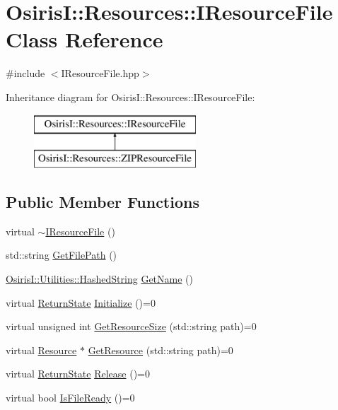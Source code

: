 \hypertarget{class_osiris_i_1_1_resources_1_1_i_resource_file}{\section{Osiris\-I\-:\-:Resources\-:\-:I\-Resource\-File Class Reference}
\label{class_osiris_i_1_1_resources_1_1_i_resource_file}
}


{\ttfamily \#include $<$I\-Resource\-File.\-hpp$>$}

Inheritance diagram for Osiris\-I\-:\-:Resources\-:\-:I\-Resource\-File\-:\begin{figure}[H]
\begin{center}
\leavevmode
\includegraphics[height=2.000000cm]{class_osiris_i_1_1_resources_1_1_i_resource_file}
\end{center}
\end{figure}
\subsection*{Public Member Functions}
\begin{DoxyCompactItemize}
\item 
virtual \hyperlink{class_osiris_i_1_1_resources_1_1_i_resource_file_aa9fbf9010e9ebbfa7ddc7952415b5c42}{$\sim$\-I\-Resource\-File} ()
\item 
std\-::string \hyperlink{class_osiris_i_1_1_resources_1_1_i_resource_file_a1b78a2e1ebf8ae9cc51e4ef23938cb3d}{Get\-File\-Path} ()
\item 
\hyperlink{class_osiris_i_1_1_utilities_1_1_hashed_string}{Osiris\-I\-::\-Utilities\-::\-Hashed\-String} \hyperlink{class_osiris_i_1_1_resources_1_1_i_resource_file_a20d04636b11bda62c6078d636b0bdf01}{Get\-Name} ()
\item 
virtual \hyperlink{namespace_osiris_i_a8f53bf938dc75c65c6a529694514013e}{Return\-State} \hyperlink{class_osiris_i_1_1_resources_1_1_i_resource_file_ad2091805ecd18ef002ceb44f681cbdc5}{Initialize} ()=0
\item 
virtual unsigned int \hyperlink{class_osiris_i_1_1_resources_1_1_i_resource_file_ab9e34a04473821f99ec0510371220d92}{Get\-Resource\-Size} (std\-::string path)=0
\item 
virtual \hyperlink{class_osiris_i_1_1_resources_1_1_resource}{Resource} $\ast$ \hyperlink{class_osiris_i_1_1_resources_1_1_i_resource_file_a3e4296e62c50fd4124085e38aa3e213e}{Get\-Resource} (std\-::string path)=0
\item 
virtual \hyperlink{namespace_osiris_i_a8f53bf938dc75c65c6a529694514013e}{Return\-State} \hyperlink{class_osiris_i_1_1_resources_1_1_i_resource_file_ad9b57b042d9ba3a79c6d1ca5458f178d}{Release} ()=0
\item 
virtual bool \hyperlink{class_osiris_i_1_1_resources_1_1_i_resource_file_acbb1517b628b232bf22943b62263de4f}{Is\-File\-Ready} ()=0
\end{DoxyCompactItemize}
